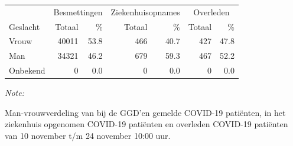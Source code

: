 \documentclass[
  english,
  man,floatsintext]{apa6}
\begin{document}
\begin{table}[H]
\centering\begingroup\fontsize{11}{13}\selectfont

\begin{threeparttable}
\begin{tabular}{lrrrrrr}
\toprule
\multicolumn{1}{c}{ } & \multicolumn{2}{c}{Besmettingen} & \multicolumn{2}{c}{Ziekenhuisopnames} & \multicolumn{2}{c}{Overleden} \\
\cmidrule(l{3pt}r{3pt}){2-3} \cmidrule(l{3pt}r{3pt}){4-5} \cmidrule(l{3pt}r{3pt}){6-7}
Geslacht & Totaal & \% & Totaal & \% & Totaal & \%\\
\midrule
Vrouw & 40011 & 53.8 & 466 & 40.7 & 427 & 47.8\\
Man & 34321 & 46.2 & 679 & 59.3 & 467 & 52.2\\
Onbekend & 0 & 0.0 & 0 & 0.0 & 0 & 0.0\\
\bottomrule
\end{tabular}
\begin{tablenotes}
\item \textit{Note: } 
\item Man-vrouwverdeling van bij de GGD’en gemelde COVID-19 patiënten, in het ziekenhuis opgenomen COVID-19 patiënten en overleden COVID-19 patiënten van 10 november t/m 24 november 10:00 uur.
\end{tablenotes}
\end{threeparttable}
\endgroup{}
\end{table}
\newpage
\end{document}
